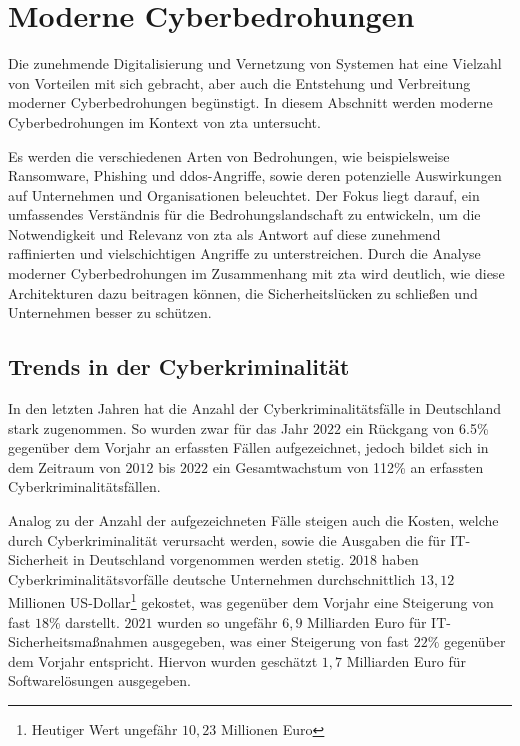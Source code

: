 \newpage


\section{Moderne Cyberbedrohungen}\label{sec:moderne-cyberbedrohungen}
Die zunehmende Digitalisierung und Vernetzung von Systemen hat eine Vielzahl von Vorteilen mit sich gebracht, aber auch die Entstehung und Verbreitung moderner Cyberbedrohungen begünstigt.
In diesem Abschnitt werden moderne Cyberbedrohungen im Kontext von \ac{zta} untersucht.

Es werden die verschiedenen Arten von Bedrohungen, wie beispielsweise Ransomware, Phishing und \ac{ddos}-Angriffe, sowie deren potenzielle Auswirkungen auf Unternehmen und Organisationen beleuchtet.
Der Fokus liegt darauf, ein umfassendes Verständnis für die Bedrohungslandschaft zu entwickeln, um die Notwendigkeit und Relevanz von \ac{zta} als Antwort auf diese zunehmend raffinierten und vielschichtigen Angriffe zu unterstreichen.
Durch die Analyse moderner Cyberbedrohungen im Zusammenhang mit \ac{zta} wird deutlich, wie diese Architekturen dazu beitragen können, die Sicherheitslücken zu schließen und Unternehmen besser zu schützen.

\subsection{Trends in der Cyberkriminalität}\label{subsec:trends-und-entwicklungen-in-der-cyberkriminalitat}
In den letzten Jahren hat die Anzahl der Cyberkriminalitätsfälle in Deutschland stark zugenommen.
So wurden zwar für das Jahr $2022$ ein Rückgang von 6.5\% gegenüber dem Vorjahr an erfassten Fällen aufgezeichnet, jedoch bildet sich in dem Zeitraum von $2012$ bis $2022$ ein Gesamtwachstum von 112\% an erfassten Cyberkriminalitätsfällen\autocite[\vglf][]{bka-cyberkriminalitaet}.

Analog zu der Anzahl der aufgezeichneten Fälle steigen auch die Kosten, welche durch Cyberkriminalität verursacht werden, sowie die Ausgaben die für IT-Sicherheit in Deutschland vorgenommen werden stetig.
$2018$ haben Cyberkriminalitätsvorfälle deutsche Unternehmen durchschnittlich $13,12$ Millionen US-Dollar\footnote{Heutiger Wert ungefähr $10,23$ Millionen Euro} gekostet, was gegenüber dem Vorjahr eine Steigerung von fast $18\%$ darstellt\autocite[\vglf][]{accenture-cyberkrime-kosten}.
$2021$ wurden so ungefähr $6,9$ Milliarden Euro für IT-Sicherheitsmaßnahmen ausgegeben, was einer Steigerung von fast $22\%$ gegenüber dem Vorjahr entspricht\autocite[\vglf][]{bitkom-itsicherheit}.
Hiervon wurden geschätzt $1,7$ Milliarden Euro für Softwarelösungen ausgegeben\autocite[\vglf][]{bitkom-itsicherheit-segment}.

